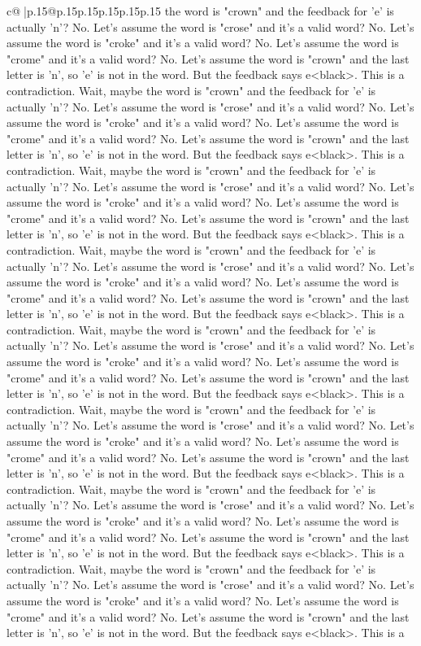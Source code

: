 \documentclass{article}
\begin{document}
{\begin{supertabular}{c@{$\;$}|p{.15\linewidth}@{}p{.15\linewidth}p{.15\linewidth}p{.15\linewidth}p{.15\linewidth}p{.15\linewidth}}
{{{the word is "crown" and the feedback for 'e' is actually 'n'? No. Let's assume the word is "crose" and it's a valid word? No. Let's assume the word is "croke" and it's a valid word? No. Let's assume the word is "crome" and it's a valid word? No. Let's assume the word is "crown" and the last letter is 'n', so 'e' is not in the word. But the feedback says e<black>. This is a contradiction. Wait, maybe the word is "crown" and the feedback for 'e' is actually 'n'? No. Let's assume the word is "crose" and it's a valid word? No. Let's assume the word is "croke" and it's a valid word? No. Let's assume the word is "crome" and it's a valid word? No. Let's assume the word is "crown" and the last letter is 'n', so 'e' is not in the word. But the feedback says e<black>. This is a contradiction. Wait, maybe the word is "crown" and the feedback for 'e' is actually 'n'? No. Let's assume the word is "crose" and it's a valid word? No. Let's assume the word is "croke" and it's a valid word? No. Let's assume the word is "crome" and it's a valid word? No. Let's assume the word is "crown" and the last letter is 'n', so 'e' is not in the word. But the feedback says e<black>. This is a contradiction. Wait, maybe the word is "crown" and the feedback for 'e' is actually 'n'? No. Let's assume the word is "crose" and it's a valid word? No. Let's assume the word is "croke" and it's a valid word? No. Let's assume the word is "crome" and it's a valid word? No. Let's assume the word is "crown" and the last letter is 'n', so 'e' is not in the word. But the feedback says e<black>. This is a contradiction. Wait, maybe the word is "crown" and the feedback for 'e' is actually 'n'? No. Let's assume the word is "crose" and it's a valid word? No. Let's assume the word is "croke" and it's a valid word? No. Let's assume the word is "crome" and it's a valid word? No. Let's assume the word is "crown" and the last letter is 'n', so 'e' is not in the word. But the feedback says e<black>. This is a contradiction. Wait, maybe the word is "crown" and the feedback for 'e' is actually 'n'? No. Let's assume the word is "crose" and it's a valid word? No. Let's assume the word is "croke" and it's a valid word? No. Let's assume the word is "crome" and it's a valid word? No. Let's assume the word is "crown" and the last letter is 'n', so 'e' is not in the word. But the feedback says e<black>. This is a contradiction. Wait, maybe the word is "crown" and the feedback for 'e' is actually 'n'? No. Let's assume the word is "crose" and it's a valid word? No. Let's assume the word is "croke" and it's a valid word? No. Let's assume the word is "crome" and it's a valid word? No. Let's assume the word is "crown" and the last letter is 'n', so 'e' is not in the word. But the feedback says e<black>. This is a contradiction. Wait, maybe the word is "crown" and the feedback for 'e' is actually 'n'? No. Let's assume the word is "crose" and it's a valid word? No. Let's assume the word is "croke" and it's a valid word? No. Let's assume the word is "crome" and it's a valid word? No. Let's assume the word is "crown" and the last letter is 'n', so 'e' is not in the word. But the feedback says e<black>. This is a }}}
\end{supertabular}}
\end{document}
